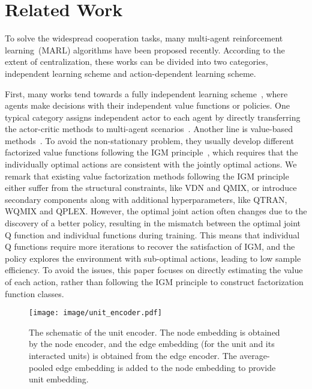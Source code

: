 \documentclass[letterpaper]{article} \usepackage{aaai23}  \usepackage{times}  \usepackage{helvet}  \usepackage{courier}  \usepackage[hyphens]{url}  \usepackage{graphicx} \urlstyle{rm} \def\UrlFont{\rm}  \usepackage{natbib}  \usepackage{caption} \frenchspacing  \setlength{\pdfpagewidth}{8.5in} \setlength{\pdfpageheight}{11in} \usepackage{algorithm}
\begin{document}
 \section{Related Work}
\vspace{-0.5ex}
To solve the widespread cooperation tasks, many multi-agent reinforcement learning~(MARL) algorithms have been proposed recently. According to the extent of centralization, these works can be divided into two categories, independent learning scheme and action-dependent learning scheme.

First, many works tend towards a fully independent learning scheme~\citeyear{multisurvey}, where agents make decisions with their independent value functions or policies. One typical category assigns independent actor to each agent by directly transferring the actor-critic methods to multi-agent scenarios~\citeyear{coma, maddpg, mappo, noisy_mappo}.
Another line is value-based methods~\citeyear{iql, vdn, qmix, wqmix, qtran, qtran++, collaq, wang2020qplex}.
To avoid the non-stationary problem, they usually develop different factorized value functions following the IGM principle~\citeyear{qtran}, which requires that the individually optimal actions are consistent with the jointly optimal actions. We remark that existing value factorization methods following the IGM principle either suffer from the structural constraints, like VDN and QMIX, or introduce secondary components along with additional hyperparameters, like QTRAN, WQMIX and QPLEX. 
However, the optimal joint action often changes due to the discovery of a better policy, resulting in the mismatch between the optimal joint Q function and individual functions during training. This means that individual Q functions require more iterations to recover the satisfaction of IGM, and the policy explores the environment with sub-optimal actions, leading to low sample efficiency.
To avoid the issues, this paper focuses on directly estimating the value of each action, rather than following the IGM principle to construct factorization function classes. 




\begin{figure*}[t]
    \centering
    \texttt{[image: image/unit\_encoder.pdf]}
\vspace{-3ex}
    \caption{The schematic of the unit encoder. The node embedding is obtained by the node encoder, and the edge embedding (for the unit and its interacted units) is obtained from the edge encoder. The average-pooled edge embedding is added to the node embedding to provide unit embedding.}
\vspace{-4ex}
    \label{fig:unit_encoder}
\end{figure*}
\end{document}
